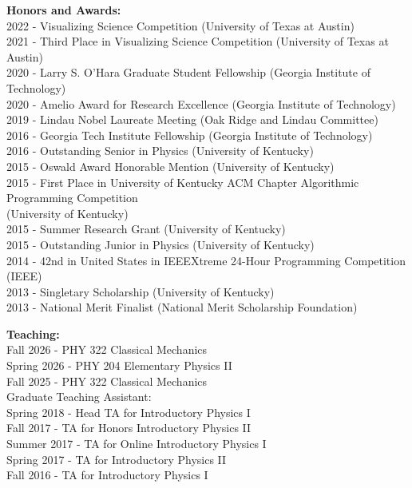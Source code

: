 \documentclass[11pt]{article}
\begin{document}
\begin{flushleft}
  \textbf{Honors and Awards:}\\
  2022 - Visualizing Science Competition (University of Texas at Austin)\\
  2021 - Third Place in Visualizing Science Competition (University of Texas at Austin)\\
  2020 - Larry S. O'Hara Graduate Student Fellowship (Georgia Institute of Technology)\\
  2020 - Amelio Award for Research Excellence (Georgia Institute of Technology)\\
  2019 - Lindau Nobel Laureate Meeting (Oak Ridge and Lindau Committee)\\
  2016 - Georgia Tech Institute Fellowship (Georgia Institute of Technology)\\
  2016 - Outstanding Senior in Physics (University of Kentucky)\\
  2015 - Oswald Award Honorable Mention (University of Kentucky)\\
  \vspace{2px}
  2015 - First Place in University of Kentucky ACM Chapter Algorithmic Programming Competition\\ 
  \hspace{29px} (University of Kentucky)\\
  2015 - Summer Research Grant (University of Kentucky)\\
  2015 - Outstanding Junior in Physics (University of Kentucky)\\
  2014 - 42nd in United States in IEEEXtreme 24-Hour Programming Competition (IEEE)\\
  2013 - Singletary Scholarship (University of Kentucky)\\
  2013 - National Merit Finalist (National Merit Scholarship Foundation)\\

\vspace{8px}

  \textbf{Teaching:}\\
  Fall 2026 - PHY 322 Classical Mechanics\\
  Spring 2026 - PHY 204 Elementary Physics II\\
  Fall 2025 -  PHY 322 Classical Mechanics\\
  Graduate Teaching Assistant:\\
  \quad Spring 2018 - Head TA for Introductory Physics I\\
  \quad Fall 2017 - TA for Honors Introductory Physics II\\
  \quad Summer 2017 - TA for Online Introductory Physics I\\
  \quad Spring 2017 - TA for Introductory Physics II\\
  \quad Fall 2016 - TA for Introductory Physics I\\
  

\end{flushleft}
\end{document}
